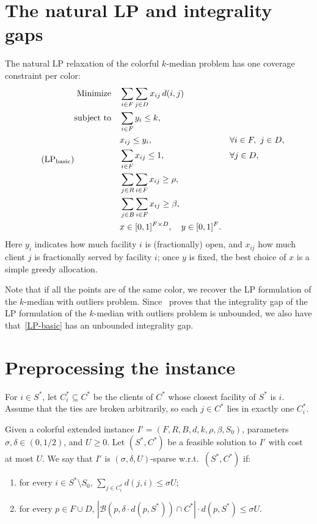 \documentclass[a4paper,11pt]{article}
\begin{document}
\section{The natural LP and integrality gaps}
\label{sec:lp}

The natural LP relaxation of the colorful $k$-median problem has one
coverage constraint per color:
\begin{equation}\tag{$\text{LP}_{\text{basic}}$} \label{LP-basic}
\begin{aligned}
\text{Minimize} \quad &\sum_{i \in F} \sum_{j \in D} x_{ij} \,d(i,j) \\
\text{subject to} \quad &\sum_{i \in F} y_i \le k, \\
&x_{ij} \le y_i, && \forall i \in F, \ j \in D,\\
&\sum_{i \in F} x_{ij} \le 1, && \forall j \in D,\\
&\sum_{j \in R} \sum_{i \in F} x_{ij} \ge \rho, \\
&\sum_{j \in B} \sum_{i \in F} x_{ij} \ge \beta, \\
&x \in[0,1]^{F\times D}, \quad y \in [0,1]^F.
\end{aligned}
\end{equation}
Here $y_i$ indicates how much facility $i$ is (fractionally) open, and
$x_{ij}$ how much client $j$ is fractionally served by facility $i$; once
$y$ is fixed, the best choice of $x$ is a simple greedy allocation.

Note that if all the points are of the same color, we recover the LP formulation of the $k$-median with outliers problem. Since~\cite{KLS2018} proves that the integrality gap of the LP formulation of the $k$-median with outliers problem is unbounded, we also have that~\eqref{LP-basic} has an unbounded integrality gap.

\section{Preprocessing the instance}
\label{sec:preprocessing}

For $i\in S^*$, let $C_i^*\subseteq C^*$ be the clients of $C^*$ whose
closest facility of $S^*$ is $i$. Assume that the ties are broken
arbitrarily, so each $j\in C^*$ lies in exactly one $C_i^*$.

\begin{definition}
\label{def:sparse}
Given a colorful extended instance $I' = (F,R,B,d,k,\rho,\beta,S_0)$,
parameters $\sigma, \delta \in (0, 1/2)$, and $U \ge 0$. Let $(S^*, C^*)$
be a feasible solution to $I'$ with cost at most $U$. We say that $I'$
is $(\sigma, \delta, U)$-sparse w.r.t.\ $(S^*, C^*)$ if:
\begin{enumerate}[label=\alph*), ref=\thetheorem\alph*]
\item \label{def:sparse_a} for every $i \in S^* \setminus S_0$, $\sum_{j
\in C_i^*} d(j, i) \leq \sigma U$;
\item \label{def:sparse_b} for every $p \in F \cup D$, $|\mathcal{B}(p,
\delta \cdot d(p, S^*)) \cap C^*| \cdot d(p, S^*) \leq \sigma U$.
\end{enumerate}
\end{definition}
\end{document}
